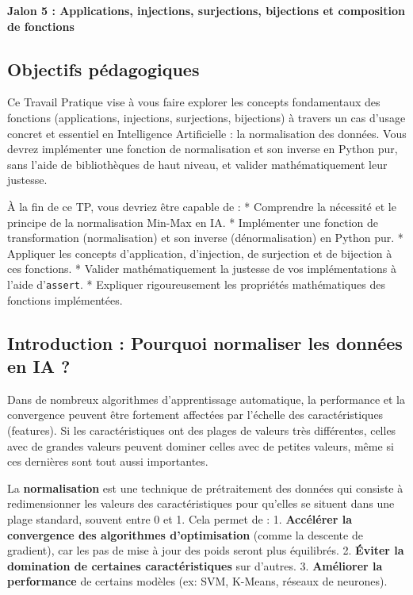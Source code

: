 \documentclass[12pt,a4paper]{report}
\newcommand{\passthrough}[1]{#1}
\begin{document}
\textbf{Jalon 5 : Applications, injections, surjections, bijections et
composition de fonctions}

\subsection{Objectifs pédagogiques}\label{objectifs-puxe9dagogiques}

Ce Travail Pratique vise à vous faire explorer les concepts fondamentaux
des fonctions (applications, injections, surjections, bijections) à
travers un cas d'usage concret et essentiel en Intelligence Artificielle
: la normalisation des données. Vous devrez implémenter une fonction de
normalisation et son inverse en Python pur, sans l'aide de bibliothèques
de haut niveau, et valider mathématiquement leur justesse.

À la fin de ce TP, vous devriez être capable de : * Comprendre la
nécessité et le principe de la normalisation Min-Max en IA. *
Implémenter une fonction de transformation (normalisation) et son
inverse (dénormalisation) en Python pur. * Appliquer les concepts
d'application, d'injection, de surjection et de bijection à ces
fonctions. * Valider mathématiquement la justesse de vos implémentations
à l'aide d'\passthrough{\lstinline!assert!}. * Expliquer rigoureusement
les propriétés mathématiques des fonctions implémentées.

\subsection{Introduction : Pourquoi normaliser les données en IA
?}\label{introduction-pourquoi-normaliser-les-donnuxe9es-en-ia}

Dans de nombreux algorithmes d'apprentissage automatique, la performance
et la convergence peuvent être fortement affectées par l'échelle des
caractéristiques (features). Si les caractéristiques ont des plages de
valeurs très différentes, celles avec de grandes valeurs peuvent dominer
celles avec de petites valeurs, même si ces dernières sont tout aussi
importantes.

La \textbf{normalisation} est une technique de prétraitement des données
qui consiste à redimensionner les valeurs des caractéristiques pour
qu'elles se situent dans une plage standard, souvent entre 0 et 1. Cela
permet de : 1. \textbf{Accélérer la convergence des algorithmes
d'optimisation} (comme la descente de gradient), car les pas de mise à
jour des poids seront plus équilibrés. 2. \textbf{Éviter la domination
de certaines caractéristiques} sur d'autres. 3. \textbf{Améliorer la
performance} de certains modèles (ex: SVM, K-Means, réseaux de
neurones).
\end{document}

